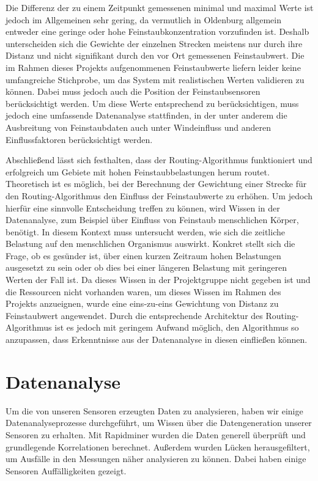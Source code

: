 Die Differenz der zu einem Zeitpunkt gemessenen minimal und maximal Werte ist jedoch im Allgemeinen sehr gering, da vermutlich in Oldenburg allgemein entweder eine geringe oder hohe Feinstaubkonzentration vorzufinden ist. Deshalb unterscheiden sich die Gewichte der einzelnen Strecken meistens nur durch ihre Distanz und nicht signifikant durch den vor Ort gemessenen Feinstaubwert. 
Die im Rahmen dieses Projekts aufgenommenen Feinstaubwerte liefern leider keine umfangreiche Stichprobe, um das System mit realistischen Werten validieren zu können.
Dabei muss jedoch auch die Position der Feinstaubsensoren berücksichtigt werden. Um diese Werte entsprechend zu berücksichtigen, muss jedoch eine umfassende Datenanalyse stattfinden, in der unter anderem die Ausbreitung von Feinstaubdaten auch unter Windeinfluss und anderen Einflussfaktoren berücksichtigt werden.

Abschließend lässt sich festhalten, dass der Routing-Algorithmus funktioniert und erfolgreich um Gebiete mit hohen Feinstaubbelastungen herum routet. 
Theoretisch ist es möglich, bei der Berechnung der Gewichtung einer Strecke für den Routing-Algorithmus den Einfluss der Feinstaubwerte zu erhöhen. Um jedoch hierfür eine sinnvolle Entscheidung treffen zu können, wird Wissen in der Datenanalyse, zum Beispiel über Einfluss von Feinstaub menschlichen Körper, benötigt. In diesem Kontext muss untersucht werden, wie sich die zeitliche Belastung auf den menschlichen Organismus auswirkt. Konkret stellt sich die Frage, ob es gesünder ist, über einen kurzen Zeitraum hohen Belastungen ausgesetzt zu sein oder ob dies bei einer längeren Belastung mit geringeren Werten der Fall ist. Da dieses Wissen in der Projektgruppe nicht gegeben ist und die Ressourcen nicht vorhanden waren, um dieses Wissen im Rahmen des Projekts anzueignen, wurde eine eins-zu-eins Gewichtung von Distanz zu Feinstaubwert angewendet. Durch die entsprechende Architektur des Routing-Algorithmus ist es jedoch mit geringem Aufwand möglich, den Algorithmus so anzupassen, dass Erkenntnisse aus der Datenanalyse in diesen einfließen können.


\section{Datenanalyse}
Um die von unseren Sensoren erzeugten Daten zu analysieren, haben wir einige Datenanalyseprozesse durchgeführt, um Wissen über die Datengeneration unserer Sensoren zu erhalten.
Mit Rapidminer wurden die Daten generell überprüft und grundlegende Korrelationen berechnet.
Außerdem wurden Lücken herausgefiltert, um Ausfälle in den Messungen näher analysieren zu können.
Dabei haben einige Sensoren Auffälligkeiten gezeigt.

